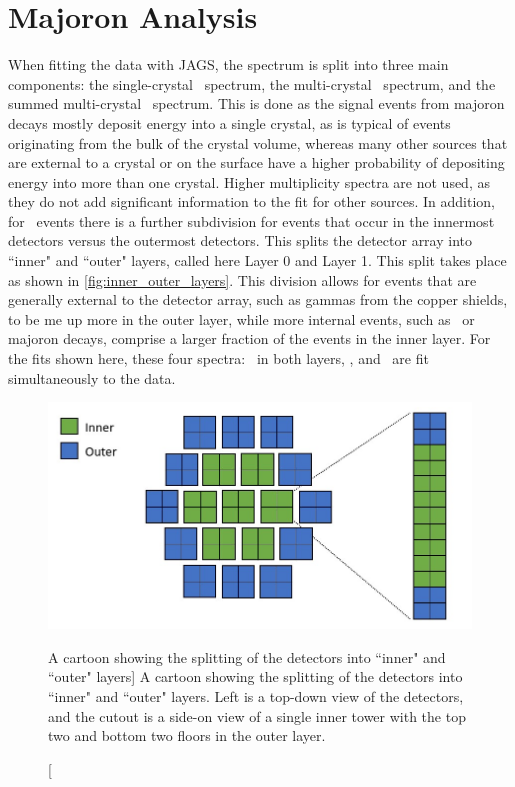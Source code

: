 \section{Majoron Analysis}
When fitting the data with JAGS, the spectrum is split into three main components: the single-crystal \Mone~spectrum, the multi-crystal \Mtwo~spectrum, and the summed multi-crystal \Msum~spectrum.
This is done as the signal events from majoron decays mostly deposit energy into a single crystal, as is typical of events originating from the bulk of the crystal volume, whereas many other sources that are external to a crystal or on the surface have a higher probability of depositing energy into more than one crystal.
Higher multiplicity spectra are not used, as they do not add significant information to the fit for other sources.
In addition, for \Mone~events there is a further subdivision for events that occur in the innermost detectors versus the outermost detectors.
This splits the detector array into ``inner" and ``outer" layers, called here Layer 0 and Layer 1.
This split takes place as shown in \autoref{fig:inner_outer_layers}.
This division allows for events that are generally external to the detector array, such as gammas from the copper shields, to be me up more in the outer layer, while more internal events, such as \twonubb~or majoron decays, comprise a larger fraction of the events in the inner layer.
For the fits shown here, these four spectra: \Mone~in both layers, \Mtwo, and \Msum~are fit simultaneously to the data.
\begin{figure}
    \centering
    \includegraphics[width=0.8\linewidth]{Figures/Inner_Outer_Layers.png}
    \caption[A cartoon showing the splitting of the detectors into ``inner" and ``outer" layers]
    {A cartoon showing the splitting of the detectors into ``inner" and ``outer" layers.
    Left is a top-down view of the detectors, and the cutout is a side-on view of a single inner tower with the top two and bottom two floors in the outer layer.}
    \label{fig:inner_outer_layers}
\end{figure}
